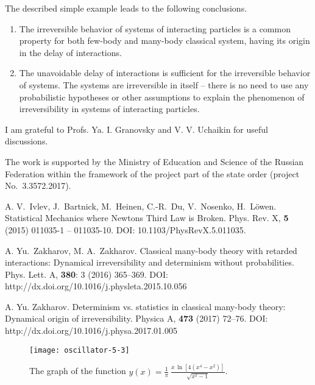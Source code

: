 \documentclass[a4,%
amsmath,amssymb,
12pt
]{revtex4-1}
\begin{document}
The described simple example leads to the following conclusions.
\begin{enumerate}
	\item The irreversible behavior of systems of interacting particles is a common property for both few-body and many-body classical system, having its origin  in the delay of interactions. 
	\item The unavoidable delay of interactions is sufficient for the irreversible behavior of systems. The systems are irreversible in itself -- there is no need to use any probabilistic hypotheses or other assumptions to explain the phenomenon of irreversibility in systems of interacting particles. 
\end{enumerate}

\begin{acknowledgments}
I am grateful to Profs. Ya. I. Granovsky and V. V. Uchaikin for useful discussions.

%
The work is supported by the Ministry of Education and Science of the Russian Federation within the framework of the project part of the state order (project No.~3.3572.2017).
\end{acknowledgments}


%
\begin{thebibliography}{99}
	
	 A. V.~Ivlev, J.~Bartnick, M.~Heinen, C.-R.~Du, V.~Nosenko, H.~L\"{o}wen. Statistical Mechanics where Newtons Third Law is Broken. Phys. Rev. X, \textbf{5} (2015) 011035-1 -- 011035-10. DOI: 10.1103/PhysRevX.5.011035.
	
	
	 {A. Yu.~Zakharov, M. A.~Zakharov}. Classical many-body theory with retarded interactions: Dynamical irreversibility and determinism without probabilities. 
	Phys. Lett. A, \textbf{380}: 3 (2016) 365--369. DOI:  http://dx.doi.org/10.1016/j.physleta.2015.10.056
	
	
	 A. Yu. Zakharov. Determinism vs. statistics in classical many-body theory: Dynamical origin of irreversibility. 
	Physica A, \textbf{473} (2017) 72--76. DOI:  http://dx.doi.org/10.1016/j.physa.2017.01.005
	
	
	
\end{thebibliography}





\begin{figure}[b]
	\texttt{[image: oscillator-5-3]}
	\caption{The graph of the function $y(x)=\frac{1}{\pi}\ \frac{x\,\ln \left[4\left( x^4 - x^2\right)  \right]}{\sqrt{x^2-1}}$.}
	\label{fig:oscillator}
\end{figure}
\end{document}
